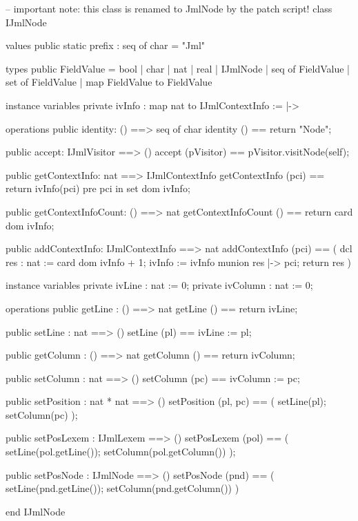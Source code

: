 \begin{vdm_al}
-- important note: this class is renamed to JmlNode by the patch script!
class IJmlNode

values
  public static prefix : seq of char = "Jml"

types
  public FieldValue = 
    bool | char | nat | real | IJmlNode | 
    seq of FieldValue |
    set of FieldValue |
    map FieldValue to FieldValue

instance variables
  private ivInfo : map nat to IJmlContextInfo := {|->}

operations
  public identity: () ==> seq of char
  identity () == return "Node";

  public accept: IJmlVisitor ==> ()
  accept (pVisitor) == pVisitor.visitNode(self);

  public getContextInfo: nat ==> IJmlContextInfo
  getContextInfo (pci) == return ivInfo(pci)
    pre pci in set dom ivInfo;

  public getContextInfoCount: () ==> nat
  getContextInfoCount () == return card dom ivInfo;

  public addContextInfo: IJmlContextInfo ==> nat
  addContextInfo (pci) ==
    ( dcl res : nat := card dom ivInfo + 1;
      ivInfo := ivInfo munion {res |-> pci};
      return res )

instance variables
  private ivLine : nat := 0;
  private ivColumn : nat := 0;

operations
  public getLine : () ==> nat
  getLine () == return ivLine;

  public setLine : nat ==> ()
  setLine (pl) == ivLine := pl;

  public getColumn : () ==> nat
  getColumn () == return ivColumn;

  public setColumn : nat ==> ()
  setColumn (pc) == ivColumn := pc;

  public setPosition : nat * nat ==> ()
  setPosition (pl, pc) ==
    ( setLine(pl); setColumn(pc) );

  public setPosLexem : IJmlLexem ==> ()
  setPosLexem (pol) ==
    ( setLine(pol.getLine());
      setColumn(pol.getColumn()) );

  public setPosNode : IJmlNode ==> ()
  setPosNode (pnd) ==
    ( setLine(pnd.getLine());
      setColumn(pnd.getColumn()) )

end IJmlNode
\end{vdm_al}

